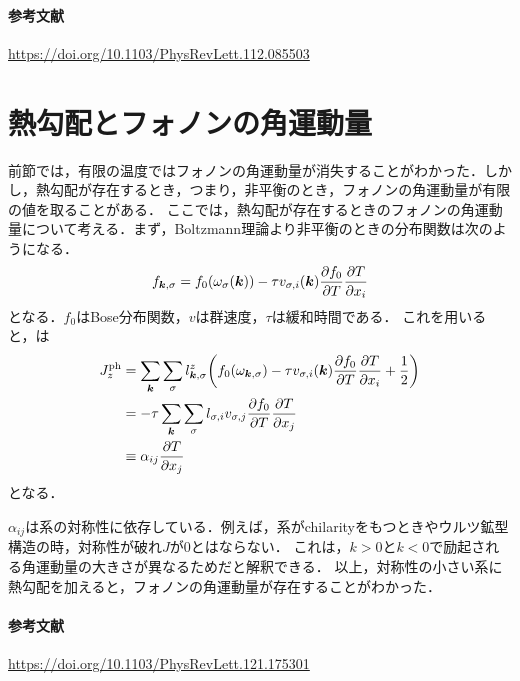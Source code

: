 \documentclass{report}
\begin{document}
\paragraph*{参考文献}
\url{https://doi.org/10.1103/PhysRevLett.112.085503}

\section{熱勾配とフォノンの角運動量}
前節では，有限の温度ではフォノンの角運動量が消失することがわかった．しかし，熱勾配が存在するとき，つまり，非平衡のとき，フォノンの角運動量が有限の値を取ることがある．
ここでは，熱勾配が存在するときのフォノンの角運動量について考える．まず，Boltzmann理論より非平衡のときの分布関数は次のようになる．
\begin{align}
  f_{\bm{k},\sigma} = f_0(\omega_\sigma(\bm{k})) - \tau v_{\sigma,i}(\bm{k}) \pdv{f_0}{T}\pdv{T}{x_i} \label{distribution}
\end{align}
となる．$f_0$はBose分布関数，$v$は群速度，$\tau$は緩和時間である．
これを用いると，は
\begin{align}
  J_z^{\mathrm{ph}} &= \sum_{\bm{k}}\sum_{\sigma} l_{\bm{k},\sigma}^z \qty(f_0(\omega_{\bm{k},\sigma}) - \tau v_{\sigma,i}(\bm{k}) \pdv{f_0}{T}\pdv{T}{x_i} + \frac{1}{2}) \\
  &= -\tau \sum_{\bm{k}}\sum_{\sigma} l_{\sigma,i} v_{\sigma,j} \pdv{f_0}{T}\pdv{T}{x_j}\\
  &\equiv \alpha_{ij}\pdv{T}{x_j}
\end{align}
となる．

$\alpha_{ij}$は系の対称性に依存している．例えば，系がchilarityをもつときやウルツ鉱型構造の時，対称性が破れ$J$が0とはならない．
これは，$k>0$と$k<0$で励起される角運動量の大きさが異なるためだと解釈できる．
以上，対称性の小さい系に熱勾配を加えると，フォノンの角運動量が存在することがわかった．
\paragraph*{参考文献}
\url{https://doi.org/10.1103/PhysRevLett.121.175301}
\end{document}
